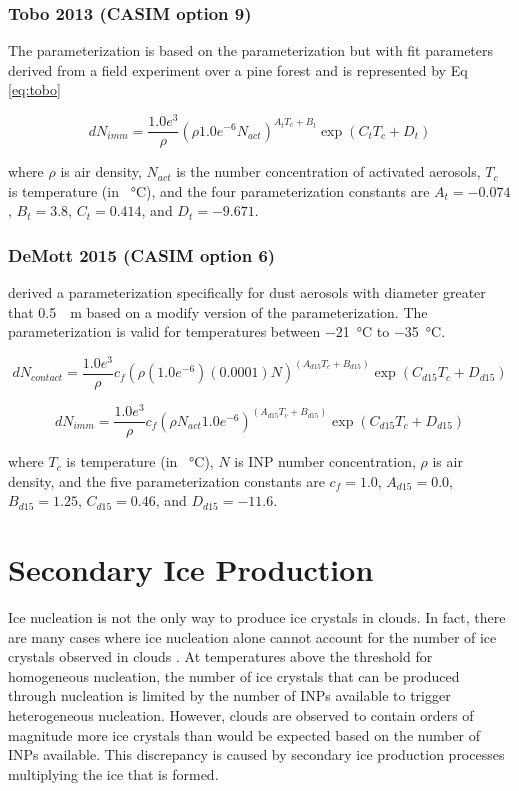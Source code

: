 \subsubsection{Tobo 2013 (CASIM option 9)}
The \cite{tobo2013} parameterization is based on the \cite{demo2010} parameterization but with fit parameters derived from a field experiment over a pine forest and is represented by Eq \ref{eq:tobo}

\begin{equation} \label{eq:tobo}
dN_{imm} = \frac{1.0e^{3}}{\rho}(\rho 1.0e^{-6} N_{act})^{A_t T_c + B_t} \exp(C_t T_c +D_t)
\end{equation}

where $\rho$ is air density, $N_{act}$ is the number concentration of activated aerosols, $T_c$ is temperature (in \SI{}{\degreeCelsius}), and the four parameterization constants are $A_t = -0.074$, $B_t = 3.8$, $C_t = 0.414$, and $D_t = -9.671$.


\subsubsection{DeMott 2015 (CASIM option 6)}
\cite{demo2015} derived a parameterization specifically for dust aerosols with diameter greater that \SI{0.5}{\mu m} based on a modify version of the \cite{tobo2013} parameterization. The parameterization is valid for temperatures between \SI{-21}{\degreeCelsius} to \SI{-35}{\degreeCelsius}.

\begin{equation} \label{eq:dm15_1}
dN_{contact} = \frac{1.0e^{3}}{\rho}c_f(\rho(1.0e^{-6})(0.0001)N)^{(A_{d15}T_c + B_{d15})}\exp(C_{d15}T_c + D_{d15})
\end{equation}

\begin{equation} \label{eq:dm15_2}
dN_{imm} = \frac{1.0e^{3}}{\rho}c_f (\rho N_{act} 1.0e^{-6})^{(A_{d15}T_c + B_{d15})}\exp(C_{d15}T_c + D_{d15})
\end{equation}

where $T_c$ is temperature (in \SI{}{\degreeCelsius}), $N$ is INP number concentration, $\rho$ is air density, and the five parameterization constants are $c_f = 1.0$, $A_{d15} = 0.0$, $B_{d15} = 1.25$, $C_{d15} = 0.46$, and $D_{d15} = -11.6$.

\section{Secondary Ice Production} \label{ch:sip}
Ice nucleation is not the only way to produce ice crystals in clouds. In fact, there are many cases where ice nucleation alone cannot account for the number of ice crystals observed in clouds \citep[e.g.][]{demo2010,oshea2017,sull2018}. At temperatures above the threshold for homogeneous nucleation, the number of ice crystals that can be produced through nucleation is limited by the number of INPs available to trigger heterogeneous nucleation. However, clouds are observed to contain orders of magnitude more ice crystals than would be expected based on the number of INPs available. This discrepancy is caused by secondary ice production processes multiplying the ice that is formed.

